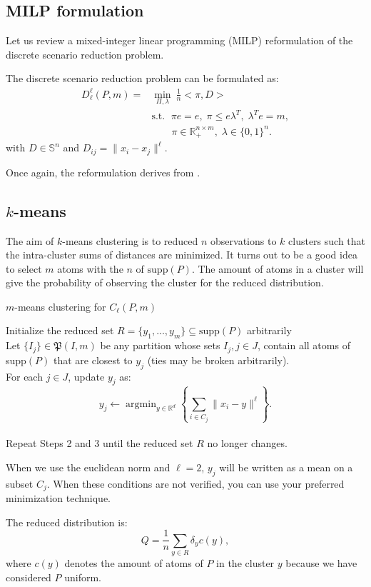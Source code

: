 \documentclass{amsart}
\newcommand{\argmin}{\mathop{\arg\min}}
\newcommand{\RR}{\mathbb{R}}
\begin{document}
\subsection{MILP formulation}
Let us review a mixed-integer linear programming (MILP) reformulation of the discrete scenario reduction problem.
\begin{theorem}
The discrete scenario reduction problem can be formulated as: 
\begin{align*}
    D_\ell^\ell\left(P,m\right)=&\min_{\Pi,\lambda}\:\frac{1}{n}<\pi,D> \\ &\text{s.t. } \;\pi e=e, \; \pi \leq e\lambda^T,\; \lambda^Te=m,\\&\quad\quad \pi\in\RR^{n\times m}_+, \; \lambda\in\{0,1\}^n.
    \end{align*}
    with $D\in \mathbb{S}^n$ and $D_{ij}=\lVert x_i-x_j\rVert^\ell$.
\end{theorem}
\begin{remark}
    Once again, the reformulation derives from .
\end{remark}
\subsection{$k$-means}
The aim of $k$-means clustering is to reduced $n$ observations to $k$ clusters such that the intra-cluster sums of distances are minimized. It turns out to be a good idea to select $m$ atoms with the $n$ of $\text{supp}\left(P\right)$. The amount of atoms in a cluster will give the probability of observing the cluster for the reduced distribution.

\begin{algorithm}
    \caption{$m$-means clustering for $C_\ell\left(P,m\right)$}\label{k m}
    Initialize the reduced set $R=\{y_1,...,y_m\} \subseteq \text{supp}\left(P\right)$ arbitrarily \\ Let $\{I_j\}\in\mathfrak{P}\left(I,m\right)$ be any partition whose sets $I_j, j\in J$, contain all atoms of supp$\left(P\right)$ that are closest to $y_j$ (ties may be broken arbitrarily). \\ For each $j\in J$, update $y_j$ as: $$y_j \gets \argmin_{y\in\RR^d} \left\{ \sum_{i\in C_j}\lVert x_i-y\rVert^\ell\right\}.$$ \\ Repeat Steps 2 and 3 until the reduced set $R$ no longer changes.
\end{algorithm}
\begin{remark}
    When we use the euclidean norm and $\ell=2$, $y_j$ will be written as a mean on a subset $C_j$. When these conditions are not verified, you can use your preferred minimization technique.
\end{remark}
\noindent The reduced distribution is:
$$
Q=\frac{1}{n}\sum_{y\in R}\delta_{y}c\left(y\right),
$$
where $ c\left(y\right)$ denotes the amount of atoms of $P$ in the cluster $y$ because we have considered $P$ uniform.
\end{document}
